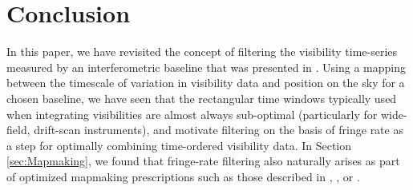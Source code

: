 \documentclass[twocolumn,apj,numberedappendix]{emulateapj}
\newcommand{\vis}{\mathbf{v}}
\newcommand{\A}{\mathbf{A}}
\newcommand{\N}{\mathbf{N}}
\begin{document}
%

\section{Conclusion}
\label{sec:conclusion}

In this paper, we have revisited the concept of filtering the visibility time-series
measured by an interferometric baseline that was presented in \citet{parsons_backer2009}.
Using a mapping between the timescale of variation in visibility data and position
on the sky for a chosen baseline, we have seen that the rectangular time windows typically
used when integrating visibilities are almost always sub-optimal (particularly for wide-field, drift-scan instruments), and motivate 
filtering on the basis of fringe rate
as a step for optimally combining time-ordered visibility data.  In Section \ref{sec:Mapmaking}, we found
that fringe-rate filtering also naturally arises as part of optimized mapmaking prescriptions such as those
described in \citet{T97mapmaking}, \citet{morales_matejek2009}, or \citet{dillon_et_al2015}.
\end{document}

